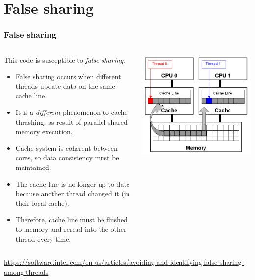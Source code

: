 \documentclass[aspectratio=169]{beamer}
\begin{document}
\section{False sharing}
\begin{frame}
\frametitle{False sharing}
\begin{columns}
\begin{column}{.65\textwidth}
This code is susceptible to \emph{false sharing}.
\begin{itemize}
  \item False sharing occurs when different threads update data on the same cache line.
  \item It is a \emph{different} phenomenon to cache thrashing, as result of parallel shared memory execution.
  \item Cache system is coherent between cores, so data consistency must be maintained.
  \item The cache line is no longer up to date because another thread changed it (in their local cache).
  \item Therefore, cache line must be flushed to memory and reread into the other thread every time.
\end{itemize}
\end{column}
\begin{column}{.35\textwidth}
\begin{center}
\includegraphics[width=\textwidth]{intel_false_sharing.png}
\end{center}
\end{column}
\end{columns}
{\Tiny \url{https://software.intel.com/en-us/articles/avoiding-and-identifying-false-sharing-among-threads}}
\end{frame}
\end{document}
